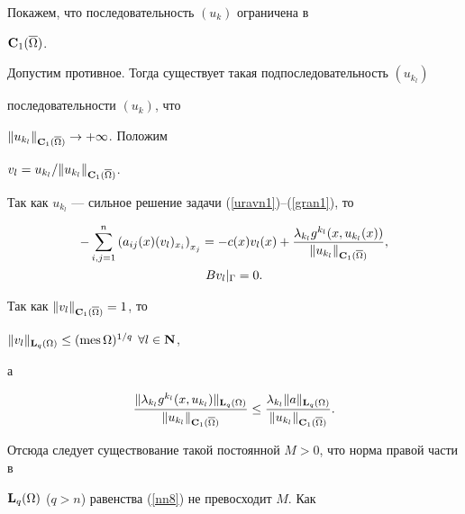 \begin{pf}


Покажем, что последовательность $(u_k)$ ограничена в


${\bold C}_1(\overline{\Omega})$.


Допустим противное. Тогда существует такая подпоследовательность $(u_{k_l})$


последовательности $(u_k)$, что


$\|u_{k_l}\|_{{\bold C}_1(\overline{\Omega})}\to +\infty$. Положим


$v_l={u_{k_l}}/{\|u_{k_l}\|_{{\bold C}_1(\overline{\Omega})}}$.


Так как $u_{k_l}$ --- сильное решение задачи (\ref{uravn1})--(\ref{gran1}), то


\begin{gather}


\label{nn8}


-\sum\limits_{i,j=1}^n {(a_{ij}(x)(v_l)_{x_i})}_{x_j}=-c(x)v_l(x)+


\frac{\lambda_{k_l}g^{k_l}(x, u_{k_l}(x))}


{\|u_{k_l}\|_{{\bold C}_1(\overline{\Omega})}}, \\


%


\label{nn9}


Bv_l |_{ \Gamma}=0.


\end{gather}


Так как $\|v_l\|_{ {\bold C}_1(\overline{\Omega})}=1$, то


$\|v_l\|_{{\bold L}_q(\Omega)}\leq (\mes\Omega)^{1/q}$ $


\forall l\in {\bold N}$,


а


\begin{equation}


\label{nn10}


\frac{\|\lambda_{k_l}g^{k_l}(x, u_{k_l})\|


_{{\bold L}_q(\Omega)}}{\|u_{k_l}\|_{{\bold C}_1(\overline{\Omega})}}


\leq\frac{\lambda_{k_l}\|a\|_{{\bold L}_q(\Omega)}}


{\|u_{k_l}\|_{{\bold C}_1(\overline{\Omega})}}.


\end{equation}


Отсюда следует существование такой постоянной $M>0$, что норма правой части в


${\bold L}_q(\Omega)$ ($q>n$) равенства (\ref{nn8}) не превосходит $M$. Как



\end{pf}
